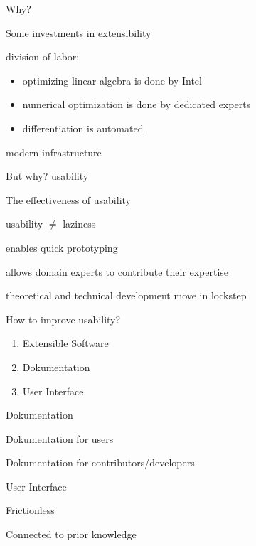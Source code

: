 \documentclass{beamer}
\newenvironment{wideitemize}{
    \itemize\addtolength{\itemsep}{15pt}\addtolength{\topsep}{10pt}}{\enditemize}
\begin{document}
    \begin{frame}{Why?}
        \begin{wideitemize}
        \item Some investments in extensibility
        \item division of labor: \begin{itemize}
            \item optimizing linear algebra is done by Intel
            \item numerical optimization is done by dedicated experts
            \item differentiation is automated
        \end{itemize}
        \item modern infrastructure
        \end{wideitemize}
    \end{frame}

    \begin{frame}{But why?}
    \centering \huge usability
    \end{frame}

    \begin{frame}{The effectiveness of usability}
      \begin{wideitemize}
        \item usability $\neq$ laziness
        \item enables quick prototyping
        \item allows domain experts to contribute their expertise
        \item theoretical and technical development move in lockstep
      \end{wideitemize}
    \end{frame}

    \begin{frame}{How to improve usability?}
      \begin{enumerate}
        \item Extensible Software
        \item Dokumentation
        \item User Interface
      \end{enumerate}
    \end{frame}

    \begin{frame}{Dokumentation}
      \begin{wideitemize}
        \item Dokumentation for users
        \item Dokumentation for contributors/developers
      \end{wideitemize}
    \end{frame}

    \begin{frame}{User Interface}
      \begin{wideitemize}
        \item Frictionless
        \item Connected to prior knowledge
      \end{wideitemize}
    \end{frame}
\end{document}
